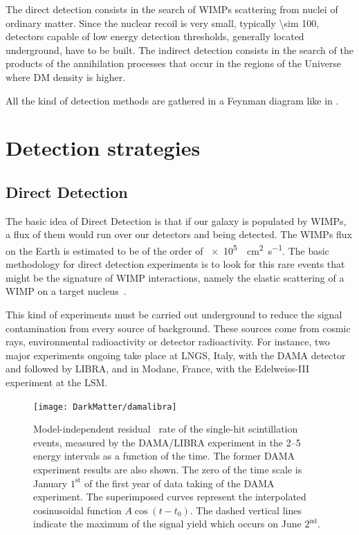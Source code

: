 The direct detection consists in the search of WIMPs scattering from nuclei of ordinary matter. Since the nuclear recoil is very small, typically \SI{\sim 100}{\kev}, detectors capable of low energy detection thresholds, generally located underground, have to be built. The indirect detection consists in the search of the products of the annihilation processes that occur in the regions of the Universe where DM density is higher.

All the kind of detection methods are gathered in a Feynman diagram like in \Fig{\ref{fig:detection}}.

\section{Detection strategies}

\subsection{Direct Detection}
The basic idea of Direct Detection is that if our galaxy is populated by WIMPs, a flux of them would run over our detectors and being detected. The WIMPs flux on the Earth is estimated to be of the order of \SI{e5}{\per \cm\squared\per\s}. The basic methodology for direct detection experiments is to look for this rare events that might be the signature of WIMP interactions, namely the elastic scattering of a WIMP on a target nucleus~\cite{snowmass}.

This kind of experiments must be carried out underground to reduce the signal contamination from every source of background. These sources come from cosmic rays, environmental radioactivity or detector radioactivity. For instance, two major experiments ongoing take place at LNGS, Italy, with the DAMA detector and followed by LIBRA, and in Modane, France, with the Edelweiss-III experiment at the LSM.
\begin{figure}[t]
\centering
\texttt{[image: DarkMatter/damalibra]}
\caption{Model-independent residual~\cite{damalibra} rate of the single-hit scintillation events, measured by the DAMA/LIBRA experiment in the \SIrange{2}{5}{\kev} energy intervals as a function of the time. The former DAMA experiment results are also shown. The zero of the time scale is January $1^{\text{st}}$ of the first year of data taking of the DAMA experiment. The superimposed curves represent the interpolated cosinusoidal function $A\cos{(t-t_0)}$. The dashed vertical lines indicate the maximum of the signal yield which occurs on June $2^{\text{nd}}$.}

\label{fig:damalibra}
\end{figure}

